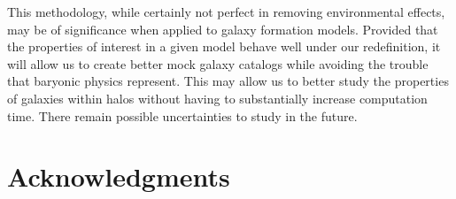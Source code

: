 \documentclass[usenatbib,usegraphicx,letterpaper]{mn2e}
\begin{document}
This methodology, while certainly not perfect in removing environmental effects, may be of significance when applied to galaxy formation models. Provided that the properties of interest in a given model behave well under our redefinition, it will allow us to create better mock galaxy catalogs while avoiding the trouble that baryonic physics represent. This may allow us to better study the properties of galaxies within halos without having to substantially increase computation time. There remain possible uncertainties to study in the future. 

\section*{Acknowledgments}



\label{lastpage}
\end{document}
